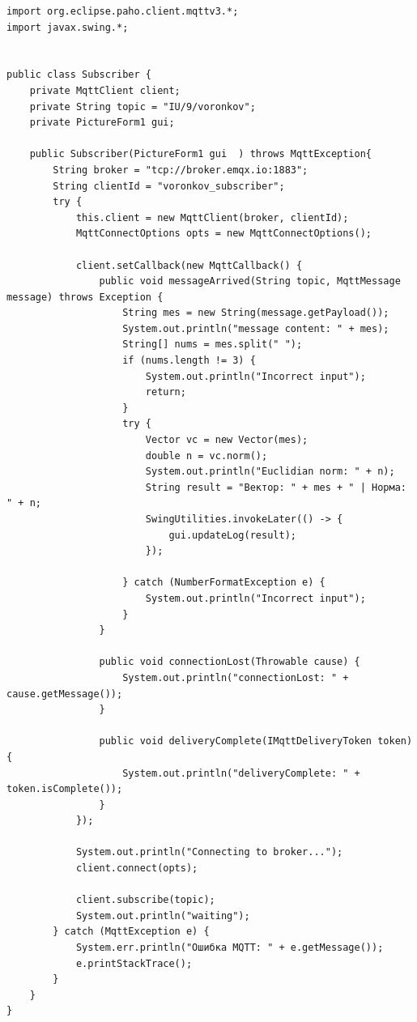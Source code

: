 \documentclass[a4paper, 14pt]{extarticle}
\begin{document}
\begin{lstlisting}
import org.eclipse.paho.client.mqttv3.*;
import javax.swing.*;


public class Subscriber {
    private MqttClient client;
    private String topic = "IU/9/voronkov";
    private PictureForm1 gui;

    public Subscriber(PictureForm1 gui  ) throws MqttException{
        String broker = "tcp://broker.emqx.io:1883";
        String clientId = "voronkov_subscriber";
        try {
            this.client = new MqttClient(broker, clientId);
            MqttConnectOptions opts = new MqttConnectOptions();

            client.setCallback(new MqttCallback() {
                public void messageArrived(String topic, MqttMessage message) throws Exception {
                    String mes = new String(message.getPayload());
                    System.out.println("message content: " + mes);
                    String[] nums = mes.split(" ");
                    if (nums.length != 3) {
                        System.out.println("Incorrect input");
                        return;
                    }
                    try {
                        Vector vc = new Vector(mes);
                        double n = vc.norm();
                        System.out.println("Euclidian norm: " + n);
                        String result = "Вектор: " + mes + " | Норма: " + n;
                        SwingUtilities.invokeLater(() -> {
                            gui.updateLog(result);
                        });

                    } catch (NumberFormatException e) {
                        System.out.println("Incorrect input");
                    }
                }

                public void connectionLost(Throwable cause) {
                    System.out.println("connectionLost: " + cause.getMessage());
                }

                public void deliveryComplete(IMqttDeliveryToken token) {
                    System.out.println("deliveryComplete: " + token.isComplete());
                }
            });

            System.out.println("Connecting to broker...");
            client.connect(opts);

            client.subscribe(topic);
            System.out.println("waiting");
        } catch (MqttException e) {
            System.err.println("Ошибка MQTT: " + e.getMessage());
            e.printStackTrace();
        }
    }
}
\end{lstlisting}
\end{document}
